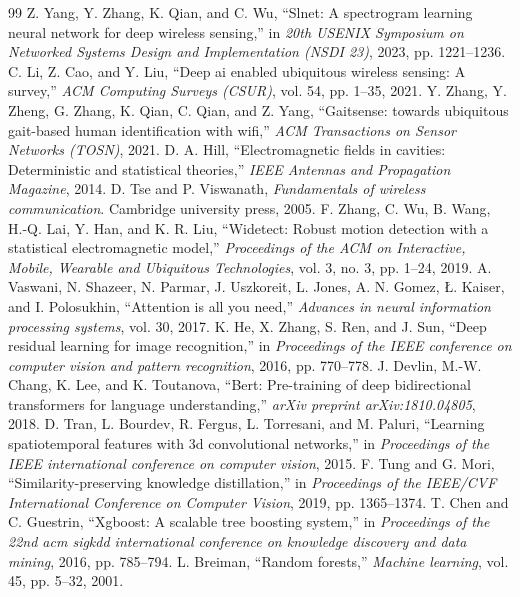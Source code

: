 \documentclass[UTF8,twocolumn]{ctexart}
\begin{document}
\begin{thebibliography}{99}
 Z. Yang, Y. Zhang, K. Qian, and C. Wu, “Slnet: A spectrogram learning neural network for deep wireless sensing,” in \emph{20th USENIX Symposium on Networked Systems Design and Implementation (NSDI 23)}, 2023, pp. 1221–1236.
 C. Li, Z. Cao, and Y. Liu, “Deep ai enabled ubiquitous wireless sensing: A survey,” \emph{ACM Computing Surveys (CSUR)}, vol. 54, pp. 1–35, 2021.
 Y. Zhang, Y. Zheng, G. Zhang, K. Qian, C. Qian, and Z. Yang, “Gaitsense: towards ubiquitous gait-based human identification with wifi,” \emph{ACM Transactions on Sensor Networks (TOSN)}, 2021.
 D. A. Hill, “Electromagnetic fields in cavities: Deterministic and statistical theories,” \emph{IEEE Antennas and Propagation Magazine}, 2014.
 D. Tse and P. Viswanath, \emph{Fundamentals of wireless communication}. Cambridge university press, 2005.
 F. Zhang, C. Wu, B. Wang, H.-Q. Lai, Y. Han, and K. R. Liu, “Widetect: Robust motion detection with a statistical electromagnetic model,” \emph{Proceedings of the ACM on Interactive, Mobile, Wearable and Ubiquitous Technologies}, vol. 3, no. 3, pp. 1–24, 2019.
 A. Vaswani, N. Shazeer, N. Parmar, J. Uszkoreit, L. Jones, A. N. Gomez, Ł. Kaiser, and I. Polosukhin, “Attention is all you need,” \emph{Advances in neural information processing systems}, vol. 30, 2017.
 K. He, X. Zhang, S. Ren, and J. Sun, “Deep residual learning for image recognition,” in \emph{Proceedings of the IEEE conference on computer vision and pattern recognition}, 2016, pp. 770–778.
 J. Devlin, M.-W. Chang, K. Lee, and K. Toutanova, “Bert: Pre-training of deep bidirectional transformers for language understanding,” \emph{arXiv preprint arXiv:1810.04805}, 2018.
 D. Tran, L. Bourdev, R. Fergus, L. Torresani, and M. Paluri, “Learning spatiotemporal features with 3d convolutional networks,” in \emph{Proceedings of the IEEE international conference on computer vision}, 2015.
 F. Tung and G. Mori, “Similarity-preserving knowledge distillation,” in \emph{Proceedings of the IEEE/CVF International Conference on Computer Vision}, 2019, pp. 1365–1374.
 T. Chen and C. Guestrin, “Xgboost: A scalable tree boosting system,” in \emph{Proceedings of the 22nd acm sigkdd international conference on knowledge discovery and data mining}, 2016, pp. 785–794.
 L. Breiman, “Random forests,” \emph{Machine learning}, vol. 45, pp. 5–32, 2001.

\end{thebibliography}
\end{document}
